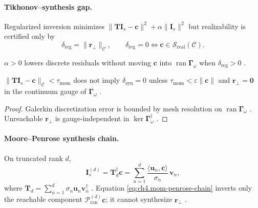 \paragraph{Tikhonov--synthesis gap.}
Regularized inversion minimizes
\(\|\mathbf{T}\mathbf{I}_{s}-\mathbf{c}\|^{2}+\alpha\|\mathbf{I}_{s}\|^{2}\) but realizability is certified only by
\begin{equation}
\label{eq:ch4.tikhonov-synthesis-gap}
\delta_{\mathrm{reg}}=\|\mathbf{r}_{\perp}\|_{\mathcal{C}},\qquad
\delta_{\mathrm{reg}}=0\iff\mathbf{c}\in\mathcal{S}_{\mathrm{real}}(\mathcal{C}).
\end{equation}
\begin{corollary}
\label{cor:ch4.reg-not-realizability}
\(\alpha>0\) lowers discrete residuals without moving \(\mathbf{c}\) into \(\operatorname{ran}\boldsymbol{\Gamma}_\omega\) when \(\delta_{\mathrm{reg}}>0\)
\cite{harrington2001,devaney2004,stratton1941}.
\end{corollary}

\begin{theorem}
\label{thm:ch4.discrete-continuum-gap}
\(\|\mathbf{T}\mathbf{I}_{s}-\mathbf{c}\|_{\mathcal{C}}<\tau_{\mathrm{mom}}\) does not imply \(\delta_{\mathrm{syn}}=0\) unless
\(\tau_{\mathrm{mom}}<\varepsilon\|\mathbf{c}\|\) and \(\mathbf{r}_{\perp}=\mathbf{0}\) in the continuum gauge of \(\boldsymbol{\Gamma}_\omega\)
\cite{harrington2001,devaney2004,stratton1941,hansen1988}.
\end{theorem}
\begin{proof}
Galerkin discretization error is bounded by mesh resolution on \(\operatorname{ran}\boldsymbol{\Gamma}_\omega\) \cite{harrington2001}. Unreachable
\(\mathbf{r}_{\perp}\) is gauge-independent in \(\ker\boldsymbol{\Gamma}_\omega^{\dagger}\) \cite{stratton1941,devaney2004}.
\end{proof}

\paragraph{Moore--Penrose synthesis chain.}
On truncated rank \(d\),
\begin{equation}
\label{eq:ch4.mom-penrose-chain}
\mathbf{I}_{s}^{(d)}=\mathbf{T}_{d}^{\dagger}\mathbf{c}
=\sum_{n=1}^{d}\frac{\langle\mathbf{u}_{n},\mathbf{c}\rangle}{\sigma_{n}}\,\mathbf{v}_{n},
\end{equation}
where \(\mathbf{T}_{d}=\sum_{n=1}^{d}\sigma_{n}\mathbf{u}_{n}\mathbf{v}_{n}^{\dagger}\) \cite{harrington2001,hansen1988}. Equation
\eqref{eq:ch4.mom-penrose-chain} inverts only the reachable component \(\mathcal{P}_{\mathrm{ran}}^{(d)}\mathbf{c}\); it cannot synthesize
\(\mathbf{r}_{\perp}\) \cite{stratton1941,devaney2004}.

